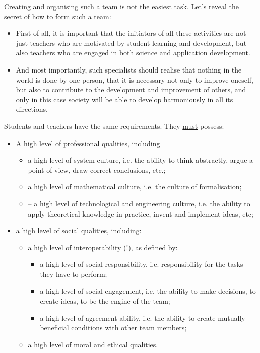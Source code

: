 \documentclass[10pt,a4paper]{article}
\begin{document}
\begin{multicols}{2}
Creating and organising such a team is not the easiest
task. Let’s reveal the secret of how to form such a team:
\begin{itemize}
\item First of all, it is important that the initiators of all these activities are not just teachers who are motivated by student learning and development, but also teachers who are engaged in both science and application development.
\item And most importantly, such specialists should realise that nothing in the world is done by one person, that it is necessary not only to improve oneself, but also to contribute to the development and improvement of others, and only in this case society will be able to develop harmoniously in all its directions.
\end{itemize}

Students and teachers have the same requirements.
They \underline{must} possess:
\begin{itemize}
\item A high level of professional qualities, including
\begin{itemize}
\item a high level of system culture, i.e. the ability to think abstractly, argue a point of view, draw correct conclusions, etc.;
\item a high level of mathematical culture, i.e. the culture of formalisation;
\item – a high level of technological and engineering culture, i.e. the ability to apply theoretical knowledge in practice, invent and implement ideas, etc;
\end{itemize}
\item a high level of social qualities, including:
\begin{itemize}
\item a high level of interoperability (!), as defined by:
\begin{itemize}
\item  a high level of social responsibility, i.e. responsibility for the tasks they have to perform;
\item a high level of social engagement, i.e. the ability to make decisions, to create ideas, to be the engine of the team;
\item a high level of agreement ability, i.e. the ability to create mutually beneficial conditions with other team members;
\end{itemize}
\item a high level of moral and ethical qualities.
\end{itemize}
\end{itemize}


\end{multicols}
\end{document}
